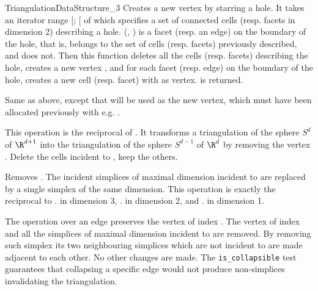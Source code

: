 \begin{ccRefConcept}{TriangulationDataStructure_3}
{Creates a new vertex by starring a hole.  It takes an iterator range
[; [ of  which specifies a set
of connected cells (resp. facets in dimension 2) describing a hole.
(, ) is a facet (resp. an edge) on the boundary of the hole,
that is,  belongs to the set of cells (resp.  facets) previously
described, and  does not.  Then this function deletes
all the cells (resp. facets) describing the hole, creates a new vertex
, and for each facet (resp. edge) on the boundary of the hole, creates
a new cell (resp. facet) with  as vertex.   is returned.
}

{ Same as above, except that  will be used as the new vertex, which
  must have been allocated previously with e.g. .}


{This operation is the reciprocal of .
It transforms a triangulation of the sphere $S^d$ of $\R^{d+1}$ into the
triangulation of the sphere $S^{d-1}$ of $\R^{d}$ by removing the vertex
. Delete the cells incident to , keep the others.
}

{Removes . The incident simplices of maximal dimension incident to
 are replaced by a single simplex of the same dimension. This
operation is exactly the reciprocal to \ccVar. in
dimension 3, \ccVar. in dimension 2, and
\ccVar. in dimension 1.
}


The  operation over an edge  preserves the vertex of index . The vertex of index  and all the simplices of maximal dimension incident to  are removed. By removing such simplex its two neighbouring simplices which are not incident to  are made adjacent to each other. No other changes are made. The \texttt{is\_collapsible} test guarantees that collapsing a specific edge would not produce non-simplices invalidating the triangulation.


\end{ccRefConcept}
